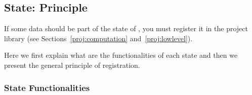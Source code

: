 \subsection{State: Principle}\label{proj:states}

\begin{important}
  If some data should be part of the state of \framac, you must register
  it in the project library (see
  Sections~\ref{proj:computation} and~\ref{proj:lowlevel}).
\end{important}

Here we first explain what are the functionalities of each state and
then we present the general principle of registration.

\subsubsection{State Functionalities}


